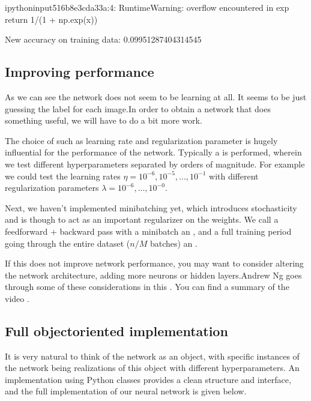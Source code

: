 \documentclass[letterpaper,10pt,english]{sphinxmanual}
\begin{document}
\begin{sphinxVerbatim}[commandchars=\\\{\}]
\PYGZlt{}ipython\PYGZhy{}input\PYGZhy{}5\PYGZhy{}16b8e3cda33a\PYGZgt{}:4: RuntimeWarning: overflow encountered in exp
  return 1/(1 + np.exp(\PYGZhy{}x))
\end{sphinxVerbatim}

\begin{sphinxVerbatim}[commandchars=\\\{\}]
New accuracy on training data: 0.09951287404314545
\end{sphinxVerbatim}


\subsection{Improving performance}
\label{\detokenize{chapter6:improving-performance}}
As we can see the network does not seem to be learning at all. It seems to be just guessing the label for each image.In order to obtain a network that does something useful, we will have to do a bit more work.

The choice of  such as learning rate and regularization parameter is hugely influential for the performance of the network. Typically a  is performed, wherein we test different hyperparameters separated by orders of magnitude. For example we could test the learning rates \(\eta = 10^{-6}, 10^{-5},...,10^{-1}\) with different regularization parameters \(\lambda = 10^{-6},...,10^{-0}\).

Next, we haven’t implemented minibatching yet, which introduces stochasticity and is though to act as an important regularizer on the weights. We call a feed\sphinxhyphen{}forward + backward pass with a minibatch an , and a full training period
going through the entire dataset (\(n/M\) batches) an .

If this does not improve network performance, you may want to consider altering the network architecture, adding more neurons or hidden layers.Andrew Ng goes through some of these considerations in this . You can find a summary of the video .


\subsection{Full object\sphinxhyphen{}oriented implementation}
\label{\detokenize{chapter6:full-object-oriented-implementation}}
It is very natural to think of the network as an object, with specific instances of the network
being realizations of this object with different hyperparameters. An implementation using Python classes provides a clean structure and interface, and the full implementation of our neural network is given below.
\end{document}
